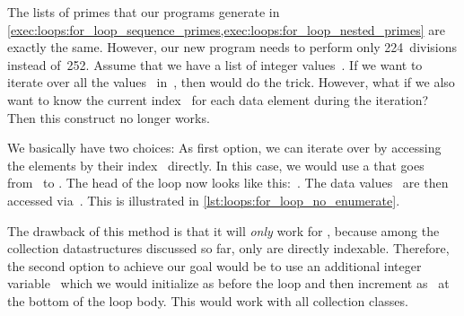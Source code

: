 The lists of primes that our programs generate in \cref{exec:loops:for_loop_sequence_primes,exec:loops:for_loop_nested_primes} are exactly the same.
However, our new program needs to perform only 224~divisions instead of~252.%
%
\FloatBarrier%
\endhsection%
%
%
%
%
%
Assume that we have a list  of integer values~.
If we want to iterate over all the values~ in~, then  would do the trick.
However, what if we also want to know the current index~ for each data element during the iteration?
Then this construct no longer works.

We basically have two choices:
As first option, we can iterate over  by accessing the elements by their index~ directly.
In this case, we would use a  that goes from~ to .
The head of the loop now looks like this:~.
The data values~ are then accessed via~.
This is illustrated in \cref{lst:loops:for_loop_no_enumerate}.

The drawback of this method is that it will \emph{only} work for , because among the collection datastructures discussed so far, only  are directly indexable.
Therefore, the second option to achieve our goal would be to use an additional integer variable~ which we would initialize as  before the loop and then increment as~ at the bottom of the loop body.
This would work with all collection classes.

